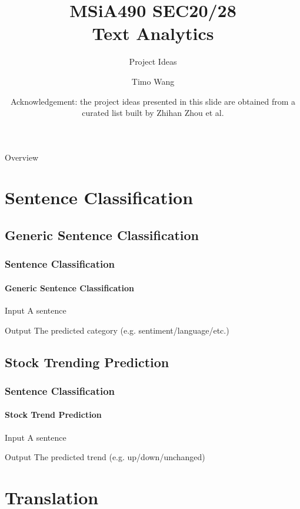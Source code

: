 \documentclass{beamer}
\begin{document}
\title{MSiA490 SEC20/28\\ Text Analytics}
\subtitle{Project Ideas}
\author{Timo Wang}
\date{\tiny Acknowledgement: the project ideas presented in this slide are obtained from a curated list built by Zhihan Zhou et al.}

\begin{frame}
    \titlepage
\end{frame}

\begin{frame}{Overview}
    \tableofcontents[hideallsubsections]
\end{frame}

\section{Sentence Classification}
\subsection{Generic Sentence Classification}
\begin{frame}
    \frametitle{Sentence Classification}
    \framesubtitle{Generic Sentence Classification}
    \begin{block}{Input}
        A sentence
    \end{block}
    
    \begin{block}{Output}
        The predicted category (e.g. sentiment/language/etc.)
    \end{block}
\end{frame}

\subsection{Stock Trending Prediction}
\begin{frame}
    \frametitle{Sentence Classification}
    \framesubtitle{Stock Trend Prediction}
    \begin{block}{Input}
        A sentence
    \end{block}
    
    \begin{block}{Output}
        The predicted trend (e.g. up/down/unchanged)
    \end{block}
\end{frame}

\section{Translation}
\end{document}
